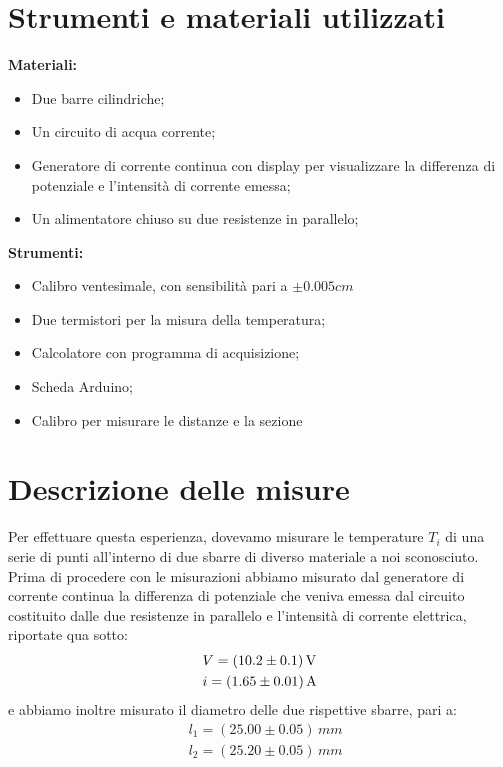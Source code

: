 \documentclass{article}
\begin{document}
\section{Strumenti e materiali utilizzati}

\textbf{Materiali:}
\begin{itemize}
	\item Due barre cilindriche;
	\item Un circuito di acqua corrente;
	\item Generatore di corrente continua con display per visualizzare la differenza di potenziale e l'intensità di corrente emessa;
	\item Un alimentatore chiuso su due resistenze in parallelo;
\end{itemize}
\textbf{Strumenti:}
\begin{itemize}
	\item Calibro ventesimale, con sensibilità pari a $\pm 0.005 cm$
	\item Due termistori per la misura della temperatura;
	\item Calcolatore con programma di acquisizione;
	\item Scheda Arduino;
	\item Calibro per misurare le distanze e la sezione
\end{itemize}
\section{Descrizione delle misure}

Per effettuare questa esperienza, dovevamo misurare le temperature $T_i$ di una serie di punti all'interno di due sbarre di diverso materiale a noi sconosciuto. \\
Prima di procedere con le misurazioni abbiamo misurato dal generatore di corrente continua la differenza di potenziale che veniva emessa dal circuito costituito dalle due resistenze in parallelo e l'intensità di corrente elettrica, riportate qua sotto:
\begin{align*}
	&V = (10.2 \pm 0.1) \, \text{\unit{V}} \\
	&i = (1.65 \pm 0.01) \, \text{\unit{A}}
\end{align*}
e abbiamo inoltre misurato il diametro delle due rispettive sbarre, pari a:
\begin{align*}
	&l_1  = (25.00 \pm 0.05) \, \unit{mm} \\
	&l_2  = (25.20 \pm 0.05) \, \unit{mm}
\end{align*}
\end{document}
